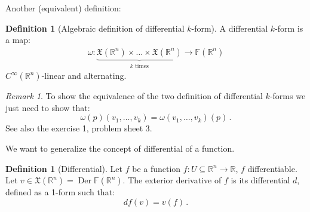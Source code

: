\documentclass[a4paper,11pt,titlepage, article, oneside]{memoir}
\numberwithin{equation}{section}
\theoremstyle{definition}
\newtheorem{definition}[theorem]{Definition}
\theoremstyle{remark}
\newtheorem{remark}[theorem]{Remark}
\DeclareMathOperator{\Der}{Der}
\newcommand{\rfield}{\mathbb{R}}
\begin{document}
Another (equivalent) definition:

\begin{definition} [Algebraic definition of differential $k$-form] \label{algkforms}
  A differential $k$-form is a map:
  \begin{align}
    \omega \colon \underbrace{\mathfrak{X}(\rfield^n) \times \ldots \times \mathfrak{X}(\rfield^n)}_{k \text{ times}} \rightarrow \mathbb{F}(\rfield^n)
  \end{align}
  $C^\infty(\rfield^n)$-linear and alternating.
\end{definition}

\begin{remarkbox}\begin{remark}
  To show the equivalence of the two definition of differential $k$-forms we just need to show that:
  \begin{equation}
    \omega(p)(v_1, \ldots, v_k) = \omega(v_1, \ldots, v_k)(p) \, .
  \end{equation}
  See also the exercise 1, problem sheet 3.
\end{remark}\end{remarkbox}

We want to generalize the concept of differential of a function.
\begin{definition}[Differential] \label{differential}
  Let $f$ be a function $f \colon U \subseteq \rfield^n \rightarrow \rfield$, $f$ differentiable. Let $v \in \mathfrak{X}(\rfield^n) = \Der \mathbb{F}(\rfield^n)$. The exterior derivative of $f$ is its differential $d$, defined as a 1-form such that:
  \begin{equation}
    df(v) = v(f) \, .
  \end{equation}
\end{definition}
\end{document}
